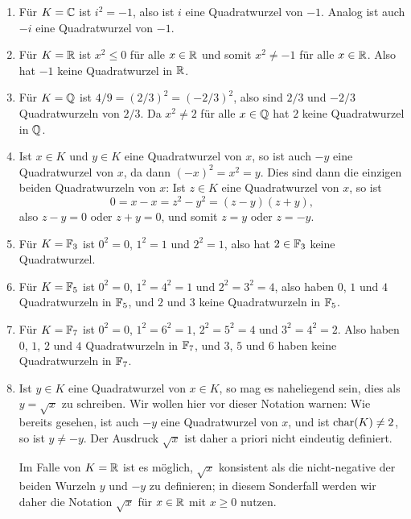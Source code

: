 \begin{bsp}
 \begin{enumerate}[leftmargin=*]
  \item
   Für $K = \mathbb{C}$ ist $i^2 = -1$, also ist $i$ eine Quadratwurzel von $-1$. Analog ist auch $-i$ eine Quadratwurzel von $-1$.
  \item
   Für $K = \mathbb{R}$ ist $x^2 \leq 0$ für alle $x \in \mathbb{R}$ und somit $x^2 \neq -1$ für alle $x \in \mathbb{R}$. Also hat $-1$ keine Quadratwurzel in $\mathbb{R}$.
  \item
   Für $K = \mathbb{Q}$ ist $4/9 = (2/3)^2 = (-2/3)^2$, also sind $2/3$ und $-2/3$ Quadratwurzeln von $2/3$. Da $x^2 \neq 2$ für alle $x \in \mathbb{Q}$ hat $2$ keine Quadratwurzel in $\mathbb{Q}$.
  \item
   Ist $x \in K$ und $y \in K$ eine Quadratwurzel von $x$, so ist auch $-y$ eine Quadratwurzel von $x$, da dann $(-x)^2 = x^2 = y$. Dies sind dann die einzigen beiden Quadratwurzeln von $x$: Ist $z \in K$ eine Quadratwurzel von $x$, so ist
   \[
    0
    = x - x
    = z^2 - y^2
    = (z - y)(z + y),
   \]
   also $z - y = 0$ oder $z + y = 0$, und somit $z = y$ oder $z = -y$.
  \item
   Für $K = \mathbb{F}_3$ ist $0^2 = 0$, $1^2 = 1$ und $2^2 = 1$, also hat $2 \in \mathbb{F}_3$ keine Quadratwurzel.
  \item
   Für $K = \mathbb{F}_5$ ist $0^2 = 0$, $1^2 = 4^2 = 1$ und $2^2 = 3^2 = 4$, also haben $0$, $1$ und $4$ Quadratwurzeln in $\mathbb{F}_5$, und $2$ und $3$ keine Quadratwurzeln in $\mathbb{F}_5$.
  \item
   Für $K = \mathbb{F}_7$ ist $0^2 = 0$, $1^2 = 6^2 = 1$, $2^2 = 5^2 = 4$ und $3^2 = 4^2 = 2$. Also haben $0$, $1$, $2$ und $4$ Quadratwurzeln in $\mathbb{F}_7$, und $3$, $5$ und $6$ haben keine Quadratwurzeln in $\mathbb{F}_7$.
  \item
   Ist $y \in K$ eine Quadratwurzel von $x \in K$, so mag es naheliegend sein, dies als $y = \sqrt{x}$ zu schreiben. Wir wollen hier vor dieser Notation warnen: Wie bereits gesehen, ist auch $-y$ eine Quadratwurzel von $x$, und ist $\mathrm{char}(K) \neq 2$, so ist $y \neq -y$. Der Ausdruck $\sqrt{x}$ ist daher a priori nicht eindeutig definiert.
   
   Im Falle von $K = \mathbb{R}$ ist es möglich, $\sqrt{x}$ konsistent als die nicht-negative der beiden Wurzeln $y$ und $-y$ zu definieren; in diesem Sonderfall werden wir daher die Notation $\sqrt{x}$ für $x \in \mathbb{R}$ mit $x \geq 0$ nutzen.
 \end{enumerate}
\end{bsp}


